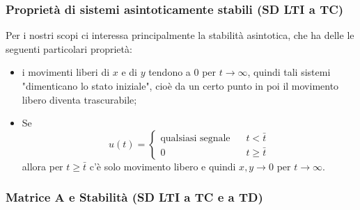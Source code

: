 \subsubsection{Proprietà di sistemi asintoticamente stabili (SD LTI a TC)}
Per i nostri scopi ci interessa principalmente la stabilità asintotica, che ha delle le seguenti particolari proprietà:
\begin{itemize}
    \item i movimenti liberi di $x$ e di $y$ tendono a $0$ per $t \rightarrow  \infty$, quindi tali sistemi "dimenticano lo stato iniziale", cioè da un certo punto in poi il movimento libero diventa trascurabile;
    \item Se 
    \[
        u(t) = \begin{cases}
            \text{qualsiasi segnale}\; \;\; & t< \bar{t}\\
            0 & t \geq \bar{t}
        \end{cases}
    \]
    allora per $t \geq \bar{t}$ c'è solo movimento libero e quindi $x,y \rightarrow 0$ per $t \rightarrow \infty$.
\end{itemize}
\subsubsection{Matrice A e Stabilità (SD LTI a TC e a TD)}
